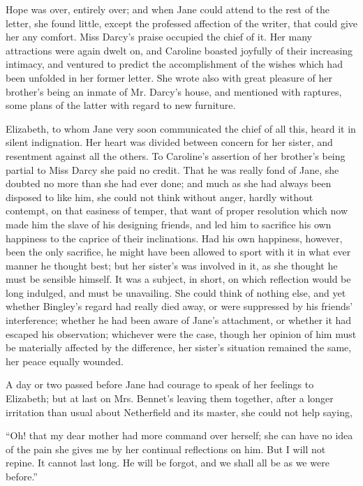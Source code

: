 Hope was over, entirely over; and when Jane could
attend to the rest of the letter, she found little, except
the professed affection of the writer, that could give her
any comfort. Miss Darcy’s praise occupied the chief of it.
Her many attractions were again dwelt on, and Caroline
boasted joyfully of their increasing intimacy, and ventured
to predict the accomplishment of the wishes which had
been unfolded in her former letter. She wrote also with
great pleasure of her brother’s being an inmate of Mr.
Darcy’s house, and mentioned with raptures, some plans
of the latter with regard to new furniture.

Elizabeth, to whom Jane very soon communicated the
chief of all this, heard it in silent indignation. Her heart
was divided between concern for her sister, and resentment
against all the others. To Caroline’s assertion of her
brother’s being partial to Miss Darcy she paid no credit.
That he was really fond of Jane, she doubted no more than
she had ever done; and much as she had always been
disposed to like him, she could not think without anger,
hardly without contempt, on that easiness of temper, that
want of proper resolution which now made him the slave
of his designing friends, and led him to sacrifice his own
happiness to the caprice of their inclinations. Had his
own happiness, however, been the only sacrifice, he might
have been allowed to sport with it in what ever manner
he thought best; but her sister’s was involved in it, as
she thought he must be sensible himself. It was a subject,
in short, on which reflection would be long indulged, and
must be unavailing. She could think of nothing else, and
yet whether Bingley’s regard had really died away, or
were suppressed by his friends’ interference; whether
he had been aware of Jane’s attachment, or whether it
had escaped his observation; whichever were the case,
though her opinion of him must be materially affected
by the difference, her sister’s situation remained the same,
her peace equally wounded.

A day or two passed before Jane had courage to speak
of her feelings to Elizabeth; but at last on Mrs. Bennet’s
leaving them together, after a longer irritation than usual
about Netherfield and its master, she could not help
saying,

“Oh! that my dear mother had more command over
herself; she can have no idea of the pain she gives me
by her continual reflections on him. But I will not
repine. It cannot last long. He will be forgot, and we
shall all be as we were before.”

